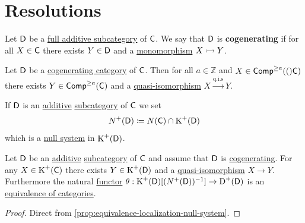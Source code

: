 \documentclass[../../main]{subfiles}
\begin{document}
\section{Resolutions}

\begin{definition}\label{def:cogenerating-category}
  Let \(\category{D}\) be a \hyperref[def:full-additive-subcategory]{full additive subcategory} of \(\category{C}\).
  We say that \(\category{D}\) is \textbf{cogenerating} if for all \(X \in \category{C}\) there exists \(Y \in \category{D}\) and a \hyperref[def:mono-epi-morphism]{monomorphism} \(X \monoarrow Y\).
\end{definition}

\begin{theorem}
  Let \(\category{D}\) be a \hyperref[def:cogenerating-category]{cogenerating category} of \(\category{C}\).
  Then for all \(a \in \mathbb{Z}\) and \(X \in \Complex[\geq a](\category{C})\) there exists \(Y \in \Complex[\geq a]{\category{C}}\) and a \hyperref[def:quasi-isomorphism]{quasi-isomorphism} \(X \xrightarrow{\text{q.i.s}} Y\).
\end{theorem}

\begin{notation}
  If \(\category{D}\) is an \hyperref[def:additive-category]{additive} \hyperref[def:subcategory]{subcategory} of \(\category{C}\) we set
  \begin{equation*}
    N^{+}(\category{D}) \coloneq N(\category{C}) \cap \operatorname{K}^{+}(\category{D})
  \end{equation*}
  which is a \hyperref[def:null-system]{null system} in \(\operatorname{K}^{+}(\category{D})\).
\end{notation}

\begin{corollary}\label{cor:localization-cogenerating}
  Let \(\category{D}\) be an \hyperref[def:additive-category]{additive} \hyperref[def:subcategory]{subcategory} of \(\category{C}\) and assume that \(\category{D}\) is \hyperref[def:cogenerating-category]{cogenerating}.
  For any \(X \in \operatorname{K}^{+}(\category{C})\) there exists \(Y \in \operatorname{K}^{+}(\category{D})\) and a \hyperref[def:quasi-isomorphism]{quasi-isomorphism} \(X \to Y\).
  Furthermore the natural \hyperref[def:functor]{functor} \(\theta: \operatorname{K}^{+}(\category{D})[(N^{+}(\category{D}))^{-1}] \to \operatorname{D}^{+}(\category{D})\) is an \hyperref[def:equivalent-categories]{equivalence of categories}.
\end{corollary}
\begin{proof}
  Direct from \autoref{prop:equivalence-localization-null-system}.
\end{proof}
\end{document}
